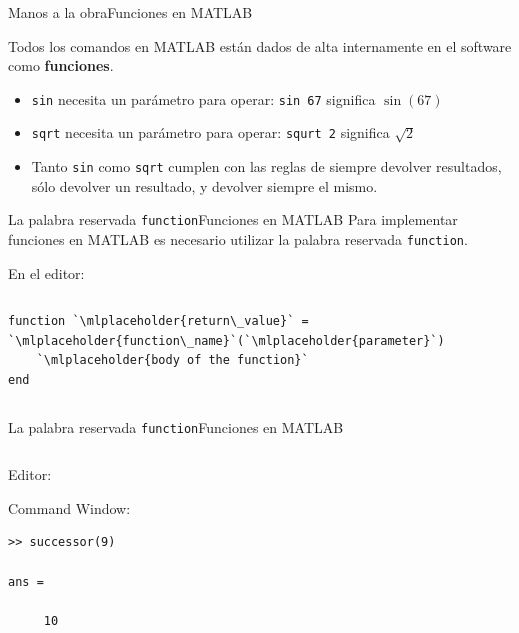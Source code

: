 \documentclass[spanish, c]{beamer}
\newcommand{\matlab}[1]{\lstinline[style=Matlab-editor]!#1!}
\begin{document}
\begin{frame}{Manos a la obra}{Funciones en MATLAB}

    Todos los comandos en MATLAB están dados de alta internamente en el software como \textbf{funciones}. \pause

    \bigskip

    \begin{itemize}[<+->]
        \itemsep2ex
        \item \matlab{sin} necesita un parámetro para operar: \matlab{sin 67} significa $\sin(67)$
        \item \matlab{sqrt} necesita un parámetro para operar: \matlab{squrt 2} significa $\sqrt{2}$
        \item Tanto \matlab{sin} como \matlab{sqrt} cumplen con las reglas de siempre devolver resultados, sólo devolver un resultado, y devolver siempre el mismo.
    \end{itemize}

\end{frame}

\begin{frame}[fragile]{La palabra reservada \matlab{function}}{Funciones en MATLAB}
    Para implementar funciones en MATLAB es necesario utilizar la palabra reservada \matlab{function}.
    
    \bigskip

    En el editor:

    \bigskip

    \begin{columns}
        \begin{column}{0.95\textwidth}
            \begin{lstlisting}
function `\mlplaceholder{return\_value}` = `\mlplaceholder{function\_name}`(`\mlplaceholder{parameter}`)
    `\mlplaceholder{body of the function}`
end
            \end{lstlisting}
        \end{column}
    \end{columns}

\end{frame}

\begin{frame}[fragile]{La palabra reservada \matlab{function}}{Funciones en MATLAB}
    \begin{columns}
        \begin{column}{0.95\linewidth}
            Editor:
            \bigskip
            

            \bigskip
            
            Command Window:
            \bigskip
\begin{lstlisting}[style=output]
>> successor(9)

ans =

     10
\end{lstlisting}
        \end{column}
    \end{columns}
\end{frame}
\end{document}
